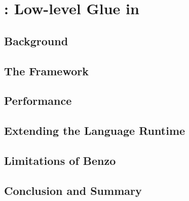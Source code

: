 
\chapter{\B: Low-level Glue in \PH}
\minitoc
\introduction


\section{Background}

\section{The \B Framework}

\section{Performance}

\section{Extending the Language Runtime}

\section{Limitations of Benzo}

\section{Conclusion and Summary}

